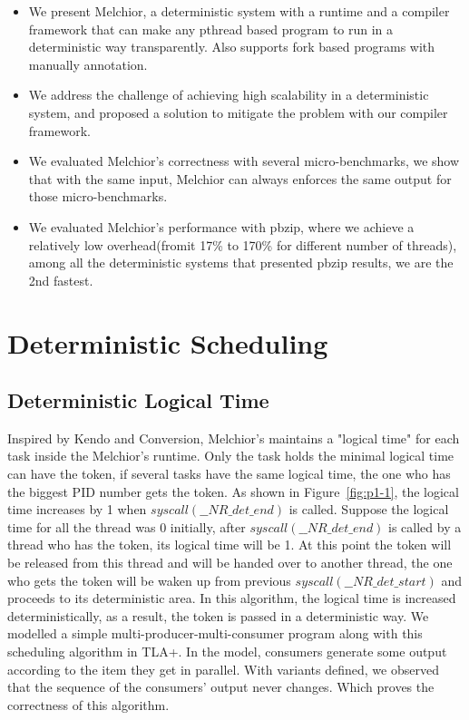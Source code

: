 \documentclass{sig-alternate}
\begin{document}
\begin{itemize}
  \item We present Melchior, a deterministic system with a runtime and a compiler framework that can make any pthread based program to run in a deterministic way transparently. Also supports fork based programs with manually annotation.
  \item We address the challenge of achieving high scalability in a deterministic system, and proposed a solution to mitigate the problem with our compiler framework.
  \item We evaluated Melchior's correctness with several micro-benchmarks, we show that with the same input, Melchior can always enforces the same output for those micro-benchmarks.
  \item We evaluated Melchior's performance with pbzip, where we achieve a relatively low overhead(fromit 17\% to 170\% for different number of threads), among all the deterministic systems that presented pbzip results, we are the 2nd fastest.
\end{itemize} 

\section{Deterministic Scheduling}
\subsection{Deterministic Logical Time}
Inspired by Kendo\cite{olszewski2009kendo} and Conversion\cite{merrifieldincreasing}, Melchior's maintains a "logical time" for each task inside the Melchior's runtime. Only the task holds the minimal logical time can have the token, if several tasks have the same logical time, the one who has the biggest PID number gets the token. As shown in Figure~\ref{fig:p1-1}, the logical time increases by 1 when $syscall(\_\_NR\_det\_end)$ is called. Suppose the logical time for all the thread was 0 initially, after $syscall(\_\_NR\_det\_end)$ is called by a thread who has the token, its logical time will be 1. At this point the token will be released from this thread and will be handed over to another thread, the one who gets the token will be waken up from previous $syscall(\_\_NR\_det\_start)$ and proceeds to its deterministic area. In this algorithm, the logical time is increased deterministically, as a result, the token is passed in a deterministic way. We modelled a simple multi-producer-multi-consumer program along with this scheduling algorithm in TLA+. In the model,  consumers generate some output according to the item they get in parallel. With variants defined, we observed that the sequence of the consumers' output never changes. Which proves the correctness of this algorithm.
\end{document}
